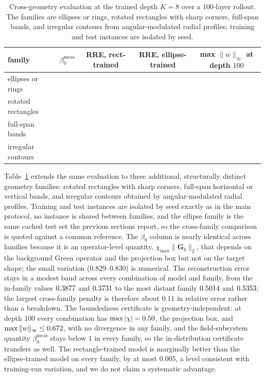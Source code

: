 \documentclass[journal,cmes,article,submit,moreauthors,pdftex]{Definitions/tsp}
\newcommand{\norm}[1]{\lVert #1 \rVert}
\newcommand{\numv}[1]{#1}
\begin{document}
\begin{table}[htbp]
\centering
\caption{Cross-geometry evaluation at the trained depth $K=8$ over a $100$-layer rollout. The
families are ellipses or rings, rotated rectangles with sharp corners, full-span bands,
and irregular contours from angular-modulated radial profiles; training and test
instances are isolated by seed.}
\label{tab:geom}
\small
\setlength{\tabcolsep}{4pt}
\begin{tabular}{lcccc}
\toprule
family & $\beta_0^{\mathrm{meas}}$ & RRE, rect-trained & RRE, ellipse-trained & max $\|w\|_\infty$ at depth $100$ \\
\midrule
ellipses or rings & \numv{\NumBetaGeomEll}    & \numv{\NumRreRectEll}    & \numv{\NumRreEllEll}    & \numv{\NumMaxWGeomEll} \\
rotated rectangles & \numv{\NumBetaGeomRect}   & \numv{\NumRreRectRect}   & \numv{\NumRreEllRect}   & \numv{\NumMaxWGeomRect} \\
full-span bands    & \numv{\NumBetaGeomStripe} & \numv{\NumRreRectStripe} & \numv{\NumRreEllStripe} & \numv{\NumMaxWGeomStripe} \\
irregular contours & \numv{\NumBetaGeomBlob}   & \numv{\NumRreRectBlob}   & \numv{\NumRreEllBlob}   & \numv{\NumMaxWGeomBlob} \\
\bottomrule
\end{tabular}
\end{table}

Table~\ref{tab:geom} extends the same evaluation to three additional, structurally
distinct geometry families: rotated rectangles with sharp corners, full-span horizontal or
vertical bands, and irregular contours obtained by angular-modulated radial profiles.
Training and test instances are isolated by seed exactly as in the main protocol, no
instance is shared between families, and the ellipse family is the same cached test set the
previous sections report, so the cross-family comparison is quoted against a common
reference. The $\beta_0$ column is nearly identical across families because it is an operator-level quantity, $\chi_{\max}\norm{\mathbf G_b}_2$, that depends on the background Green operator and the projection box but not on the target shape; the small variation ($0.829$--$0.830$) is numerical. The reconstruction error stays in a modest band across every combination of
model and family, from the in-family values $\numv{\NumRreRectRect}$ and
$\numv{\NumRreEllEll}$ to the most distant family $\numv{\NumRreRectBlob}$ and
$\numv{\NumRreEllBlob}$; the largest cross-family penalty is therefore about $0.11$ in
relative error rather than a breakdown. The boundedness certificate is
geometry-independent: at depth $100$ every combination has
$\max|\chi|=\numv{\NumMaxChiBox}$, the projection box, and
$\max\|w\|_\infty\le\numv{\NumMaxWGeomEll}$, with no divergence in any family, and the
field-subsystem quantity $\beta_0^{\mathrm{meas}}$ stays below
$1$ in every family, so the in-distribution certificate transfers as
well. The rectangle-trained model is marginally better than the ellipse-trained model on
every family, by at most $0.005$, a level consistent with training-run variation, and we
do not claim a systematic advantage.
\end{document}

